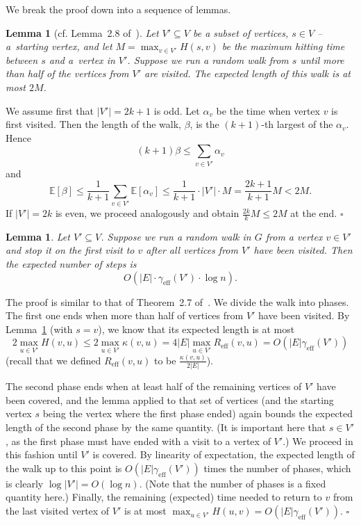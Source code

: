 \documentclass[11pt, letterpaper]{article}
\newtheorem{lemma}[theorem]{Lemma}
\newenvironment{proof}{\noindent{\bf Proof:}\hspace*{1em}}{\qed\bigskip}
\newcommand{\qed}{\hfill\ensuremath{\square}}
\newcommand{\Reff}{R_{\mathrm{eff}}}
\newcommand{\diameff}{\gamma_{\mathrm{eff}}}
\newcommand{\bE}{\mathbb{E}}
\begin{document}
We break the proof down into a sequence of lemmas.

\begin{lemma}[cf. Lemma~2.8 of~\cite{Lovasz93}] \label{lem:LovaszCoverLog}
Let $V' \subseteq V$ be a subset of vertices, $s \in V$ -- a~starting vertex, and let $M = \max_{v \in V'} H(s,v)$ be the maximum hitting time between $s$ and a~vertex in $V'$. Suppose we run a random walk from $s$ until more than half of the vertices from $V'$ are visited. The expected length of this walk is at most $2 M$.
\end{lemma}
\begin{proof}
We assume first that $|V'| = 2k+1$ is odd. Let $\alpha_v$ be the time when vertex $v$ is first visited. Then the length of the walk, $\beta$, is the $(k+1)$-th largest of the $\alpha_v$. Hence
\[(k+1) \beta \le \sum_{v \in V'} \alpha_v\]
and
\[\bE[\beta] \le \frac{1}{k+1} \sum_{v \in V'} \bE[\alpha_v] \le \frac{1}{k+1}\cdot  |V'| \cdot M = \frac{2k+1}{k+1} M < 2 M.
\]
If $|V'| = 2k$ is even, we proceed analogously and obtain $\frac{2k}{k}M\leq 2M$ at the end.
\end{proof}

\begin{lemma} \label{lem:preUltimate}
Let $V' \subseteq V$. Suppose we run a random walk in $G$ from a vertex $v \in V'$ and stop it on the first visit to $v$ after all vertices from $V'$ have been visited. Then the expected number of steps is \[O(|E| \cdot \diameff(V') \cdot \log n).\]
\end{lemma}
\begin{proof}
The proof is similar to that of Theorem~2.7 of~\cite{Lovasz93}. We divide the walk into phases. The first one ends when more than half of vertices from $V'$ have been visited. By Lemma~\ref{lem:LovaszCoverLog} (with $s = v$), we know that its expected length is at most \[
2 \max_{u \in V'} H(v,u) \le 2 \max_{u \in V'} \kappa(v,u) = 4 |E| \max_{u \in V'} \Reff(v,u) = O(|E| \diameff(V'))
\] 
(recall that we defined $\Reff(v,u)$ to be $\frac{\kappa(v,u)}{2|E|}$).

The second phase ends when at least half of the remaining vertices of $V'$ have been covered, and the lemma applied to that set of vertices (and the starting vertex $s$ being the vertex where the first phase ended) again bounds the expected length of the second phase by the same quantity. (It is important here that $s \in V'$, as the first phase must have ended with a visit to a vertex of $V'$.) We proceed in this fashion until $V'$ is covered. By linearity of expectation, the expected length of the walk up to this point is $O(|E| \diameff(V'))$ times the number of phases, which is clearly $\log |V'| = O(\log n)$. (Note that the number of phases is a fixed quantity here.) Finally, the remaining (expected) time needed to return to $v$ from the last visited vertex of $V'$ is at most $\max_{u \in V'} H(u,v) = O(|E| \diameff(V'))$.
\end{proof}
\end{document}
